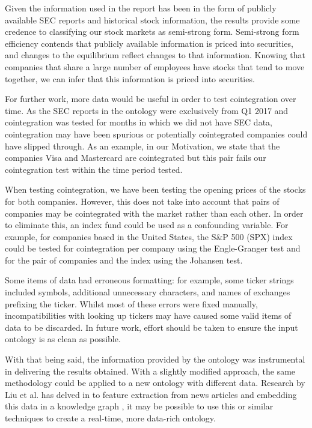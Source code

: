 \documentclass{UoYCSproject}
\begin{document}
Given the information used in the report has been in the form of publicly available SEC reports and historical stock information, the results provide some credence to classifying our stock markets as semi-strong form. Semi-strong form efficiency contends that publicly available information is priced into securities, and changes to the equilibrium reflect changes to that information. Knowing that companies that share a large number of employees have stocks that tend to move together, we can infer that this information is priced into securities.

For further work, more data would be useful in order to test cointegration over time. As the SEC reports in the ontology were exclusively from Q1 2017 and cointegration was tested for months in which we did not have SEC data, cointegration may have been spurious or potentially cointegrated companies could have slipped through. As an example, in our Motivation, we state that the companies Visa and Mastercard are cointegrated but this pair fails our cointegration test within the time period tested.

When testing cointegration, we have been testing the opening prices of the stocks for both companies. However, this does not take into account that pairs of companies may be cointegrated with the market rather than each other. In order to eliminate this, an index fund could be used as a confounding variable. For example, for companies based in the United States, the S\&P 500 (SPX) index could be tested for cointegration per company using the Engle-Granger test and for the pair of companies and the index using the Johansen test.

Some items of data had erroneous formatting: for example, some ticker strings included symbols, additional unnecessary characters, and names of exchanges prefixing the ticker. Whilst most of these errors were fixed manually, incompatibilities with looking up tickers may have caused some valid items of data to be discarded. In future work, effort should be taken to ensure the input ontology is as clean as possible.

With that being said, the information provided by the ontology was instrumental in delivering the results obtained. With a slightly modified approach, the same methodology could be applied to a new ontology with different data. Research by Liu et al. has delved in to feature extraction from news articles and embedding this data in a knowledge graph \parencite{deeplearning}, it may be possible to use this or similar techniques to create a real-time, more data-rich ontology.
\end{document}
